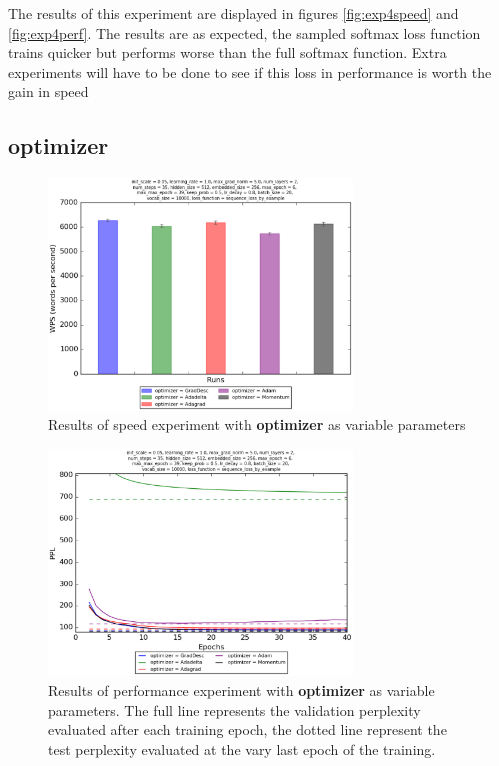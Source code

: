\documentclass[10pt,a4paper,titlepage]{article}
\begin{document}
The results of this experiment are displayed in figures \ref{fig:exp4speed} and \ref{fig:exp4perf}. The results are as expected, the sampled softmax loss function trains quicker but performs worse than the full softmax function. Extra experiments will have to be done to see if this loss in performance is worth the gain in speed

\subsection{optimizer}

\begin{figure}[H]
	\begin{center}
		\includegraphics[width=0.72\textwidth]{optspeed.eps}
		\caption{Results of speed experiment with \textbf{optimizer} as variable parameters}
		\label{fig:exp5speed}
	\end{center}	
\end{figure}

\begin{figure}[H]
	\begin{center}
		\includegraphics[width=0.72\textwidth]{optperf.eps}
		\caption{Results of performance experiment with \textbf{optimizer} as variable parameters. The full line represents the validation perplexity evaluated after each training epoch, the dotted line represent the test perplexity evaluated at the vary last epoch of the training.}
		\label{fig:exp5perf}
	\end{center}	
\end{figure}
\end{document}
